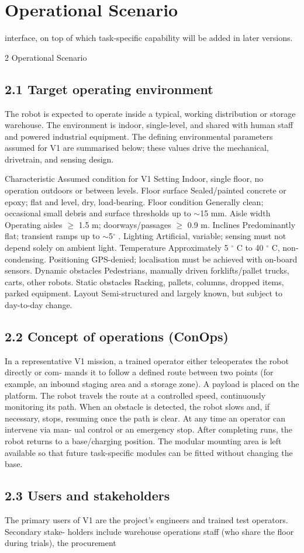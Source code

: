 \chapter{Operational Scenario}

interface, on top of which task-specific capability will be added in later versions.

2 Operational Scenario

\section*{2.1 Target operating environment}

The robot is expected to operate inside a typical, working distribution or storage warehouse. The environment is indoor, single-level, and shared with human staff and powered industrial equipment. The defining environmental parameters assumed for V1 are summarised below; these values drive the mechanical, drivetrain, and sensing design.

Characteristic                Assumed condition for V1 Setting                       Indoor, single floor, no operation outdoors or between levels. Floor surface                 Sealed/painted concrete or epoxy; flat and level, dry, load-bearing. Floor condition               Generally clean; occasional small debris and surface thresholds up to $\sim$15 mm. Aisle width                   Operating aisles $\geq$ 1.5 m; doorways/passages $\geq$ 0.9 m. Inclines                      Predominantly flat; transient ramps up to $\sim$5$^\circ$ . Lighting                      Artificial, variable; sensing must not depend solely on ambient light. Temperature                   Approximately 5 $^\circ$ C to 40 $^\circ$ C, non-condensing. Positioning                   GPS-denied; localisation must be achieved with on-board sensors. Dynamic obstacles             Pedestrians, manually driven forklifts/pallet trucks, carts, other robots. Static obstacles              Racking, pallets, columns, dropped items, parked equipment. Layout                        Semi-structured and largely known, but subject to day-to-day change.

\section*{2.2 Concept of operations (ConOps)}

In a representative V1 mission, a trained operator either teleoperates the robot directly or com- mands it to follow a defined route between two points (for example, an inbound staging area and a storage zone). A payload is placed on the platform. The robot travels the route at a controlled speed, continuously monitoring its path. When an obstacle is detected, the robot slows and, if necessary, stops, resuming once the path is clear. At any time an operator can intervene via man- ual control or an emergency stop. After completing runs, the robot returns to a base/charging position. The modular mounting area is left available so that future task-specific modules can be fitted without changing the base.

\section*{2.3 Users and stakeholders}

The primary users of V1 are the project's engineers and trained test operators. Secondary stake- holders include warehouse operations staff (who share the floor during trials), the procurement

